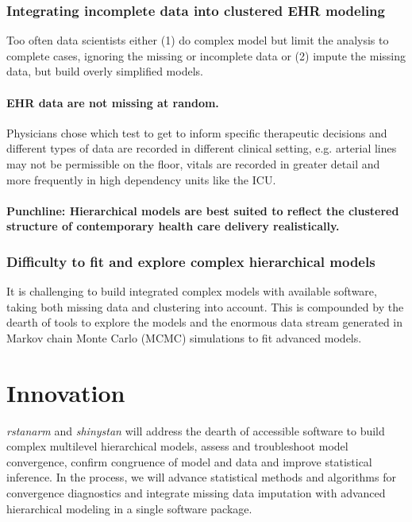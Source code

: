 \documentclass[11pt,notitlepage]{article}
\begin{document}
\section*{Integrating incomplete data into clustered EHR modeling}

Too often data scientists either (1) do complex model but limit the analysis to complete cases, ignoring the missing or incomplete data or (2) impute the missing data, but build overly simplified models. 

\subsection*{EHR data are not missing at random.} Physicians chose which test to get to inform specific therapeutic decisions and different types of data are recorded in different clinical setting, e.g. arterial lines may not be permissible on the floor, vitals are recorded in greater detail and more frequently in high dependency units like the ICU. 


\subsection*{Punchline: Hierarchical models  are best suited to reflect the clustered structure of contemporary health care delivery realistically.}

\section*{Difficulty to fit and explore complex hierarchical models}
It is challenging to build integrated complex models with available software, taking both missing data and clustering  into account. This is compounded by the dearth of tools to explore the models and the enormous data stream generated in Markov chain Monte Carlo (MCMC) simulations to fit advanced models.   


\part*{Innovation}

\textit{rstanarm} and \textit{shinystan} will address the dearth of accessible software to build complex multilevel hierarchical models, assess and troubleshoot model convergence, confirm congruence of model and data and improve statistical inference. In the process, we will advance statistical methods and algorithms for convergence diagnostics and integrate missing data imputation with advanced hierarchical modeling in a single software package.  
\end{document}
